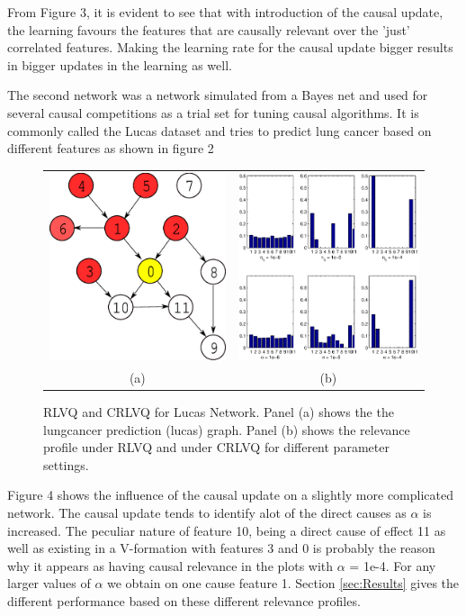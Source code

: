 \documentclass{esannV2}
\begin{document}
From Figure 3, it is evident to see that with introduction of the causal update, the learning favours the features that are causally relevant over the 'just' correlated features. Making the learning rate for the causal update bigger results in bigger updates in the learning as well.

The second network was a network simulated from a Bayes net and used for several causal competitions as a trial set for tuning causal algorithms. It is commonly called the Lucas dataset\cite{12} and tries to predict lung cancer based on different features as shown in figure 2\\

\begin{figure}[!h]
\begin{tabular}{cc}
\includegraphics[width=.3\textwidth]{lucasgraph.eps} & 
\includegraphics[width=.7\textwidth, height=0.6\textwidth]{lucaslambda.eps} \\
(a) &  (b)  
\end{tabular}
\label{fig:lucas}
\caption{RLVQ and CRLVQ for Lucas Network. Panel (a) shows the the lungcancer prediction (lucas) graph. Panel (b) shows the relevance profile under RLVQ and under CRLVQ for different parameter settings.}
\end{figure}

Figure 4 shows the influence of the causal update on a slightly more complicated network. The causal update tends to identify alot of the direct causes as $\alpha$ is increased. The peculiar nature of feature 10, being a direct cause of effect 11 as well as existing in a V-formation with features 3 and 0 is probably the reason why it appears as having causal relevance in the plots with $\alpha$ = 1e-4. For any larger values of $\alpha$ we obtain on one cause feature 1. Section \ref{sec:Results} gives the different performance based on these different relevance profiles.
\end{document}
